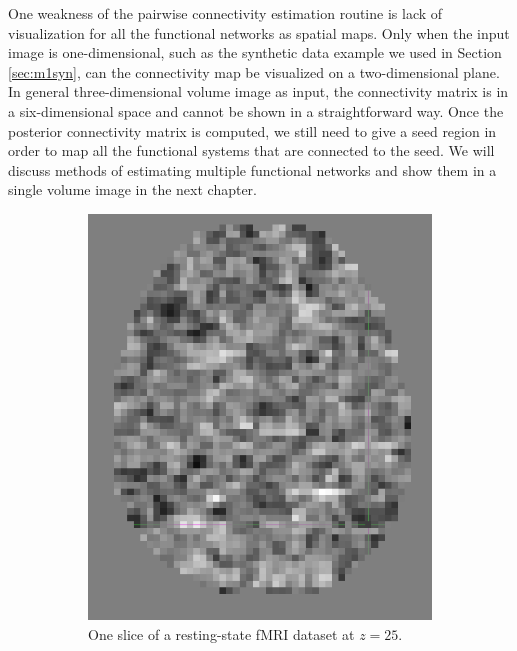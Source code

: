 One weakness of the pairwise connectivity estimation routine is lack of
visualization for all the functional networks as spatial maps. Only when the
input image is one-dimensional, such as the synthetic data example we used in
Section \ref{sec:m1syn}, can the connectivity map be visualized on a
two-dimensional plane. In general three-dimensional volume image as input, the
connectivity matrix is in a six-dimensional space and cannot be shown in a
straightforward way. Once the posterior connectivity matrix is computed, we
still need to give a seed region in order to map all the functional systems
that are connected to the seed. We will discuss methods of estimating multiple
functional networks and show them in a single volume image in the next
chapter.



\begin{figure}[p]
  \centering
  \begin{subfigure}[b]{0.3\textwidth}
    \centering
    \includegraphics[height=\textwidth]{figures/method1/fmrislice}
    \caption{One slice of a resting-state fMRI dataset at $z = 25$. }
    \label{fig:fmrislice}
    \end{subfigure}
~
  \begin{subfigure}[b]{0.3\textwidth}
    \centering

\end{subfigure}
\end{figure}
